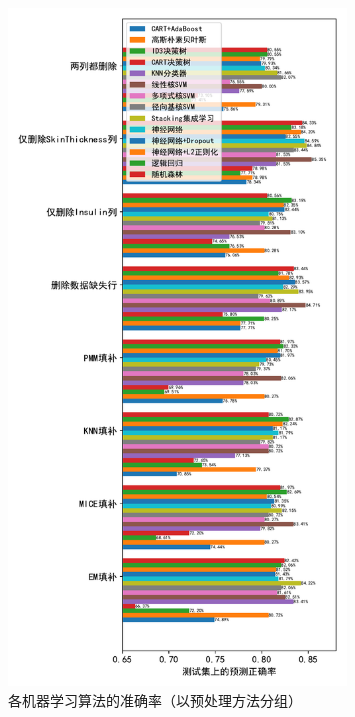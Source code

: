 \documentclass[a4paper]{ctexart}
\begin{document}
\begin{figure}[htbp]
	\centering
	\includegraphics[width=0.8\textwidth]{figure/f3.pdf}
	\caption{各机器学习算法的准确率（以预处理方法分组）}
	\label{figure:数据集正确率}
\end{figure}
\end{document}
